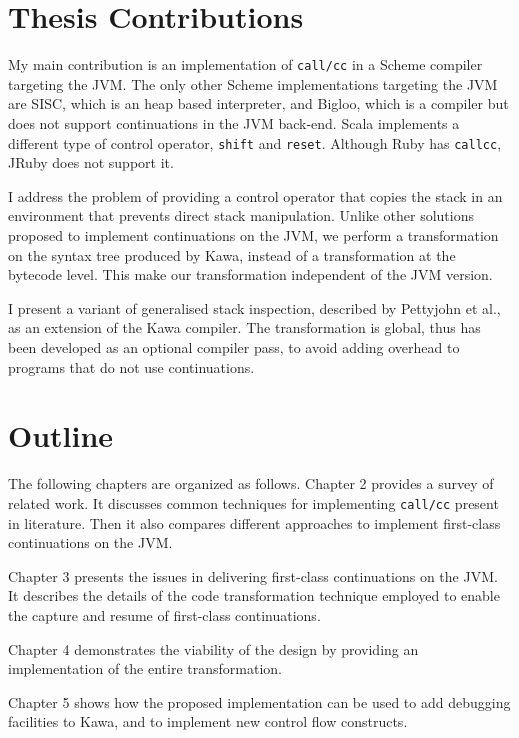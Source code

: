 \documentclass[12pt,a4paper,oneside,openright]{book}
\begin{document}
\section{Thesis Contributions}\label{thesis-contributions}

My main contribution is an implementation of \texttt{call/cc} in a
Scheme compiler targeting the JVM. The only other Scheme implementations
targeting the JVM are SISC, which is an heap based interpreter, and
Bigloo, which is a compiler but does not support continuations in the
JVM back-end. Scala implements a different type of control operator,
\texttt{shift} and \texttt{reset}. Although Ruby has \texttt{callcc},
JRuby does not support it.

I address the problem of providing a control operator that copies the
stack in an environment that prevents direct stack manipulation. Unlike
other solutions proposed to implement continuations on the JVM, we
perform a transformation on the syntax tree produced by Kawa, instead of
a transformation at the bytecode level. This make our transformation
independent of the JVM version.

I present a variant of generalised stack inspection, described by
Pettyjohn et al., as an extension of the Kawa compiler. The
transformation is global, thus has been developed as an optional
compiler pass, to avoid adding overhead to programs that do not use
continuations.

\section{Outline}\label{outline}

The following chapters are organized as follows. Chapter 2 provides a
survey of related work. It discusses common techniques for implementing
\texttt{call/cc} present in literature. Then it also compares different
approaches to implement first-class continuations on the JVM.

Chapter 3 presents the issues in delivering first-class continuations on
the JVM. It describes the details of the code transformation technique
employed to enable the capture and resume of first-class continuations.

Chapter 4 demonstrates the viability of the design by providing an
implementation of the entire transformation.

Chapter 5 shows how the proposed implementation can be used to add
debugging facilities to Kawa, and to implement new control flow
constructs.
\end{document}
